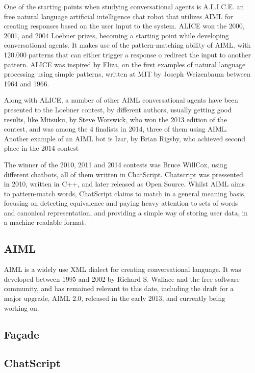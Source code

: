One of the starting points when studying conversational agents is A.L.I.C.E. an free natural language artificial intelligence chat robot that utilizes AIML for creating responses based on the user input to the system. ALICE won the 2000, 2001, and 2004 Loebner prizes, becoming a starting point while developing conversational agents. It makes use of the pattern-matching ability of AIML, with 120.000 patterns that can either trigger a response o redirect the input to another pattern. ALICE was inspired by Eliza, on the first examples of natural language processing using simple patterns, written at MIT by Joseph Weizenbaum between 1964 and 1966.

Along with ALICE, a number of other AIML conversational agents have been presented to the Loebner contest, by different authors, usually getting good results, like Mitsuku, by Steve Worswick, who won the 2013 edition of the contest, and was among the 4 finalists in 2014, three of them using AIML. Another example of an AIML bot is Izar, by Brian Rigsby, who achieved second place in the 2014 contest

The winner of the 2010, 2011 and 2014 contests was Bruce WillCox, using different chatbots, all of them written in ChatScript. Chatscript was pressented in 2010, written in C++, and later released as Open Source. Whilst AIML aims to pattern-match words, ChatScript claims to match in a general meaning basis, focusing on detecting equivalence and paying heavy attention to sets of words and canonical representation, and providing a simple way of storing user data, in a machine readable format.

\subsection{\ac{AIML}}

\ac{AIML} is a widely use XML dialect for creating conversational language. It was developed between 1995 and 2002 by Richard S. Wallace and the free software community, and has remained relevant to this date, including the draft for a major upgrade, AIML 2.0, released in the early 2013, and currently being working on.

\subsection{Façade}

\subsection{ChatScript}

